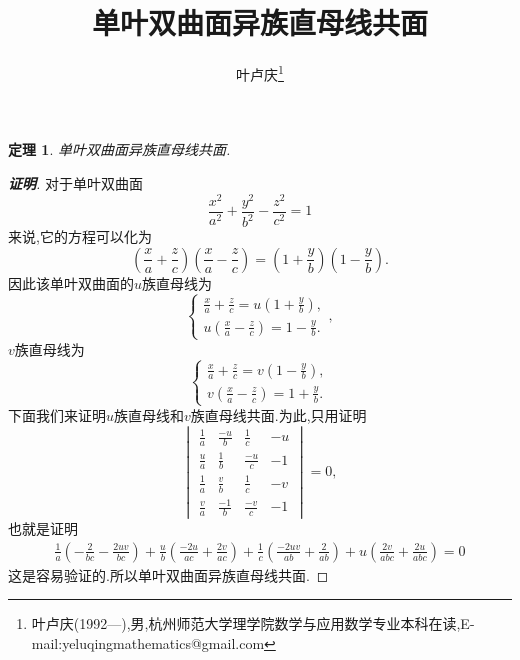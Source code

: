 \documentclass[a4paper]{article}
\newtheorem*{theo}{定理}
\newenvironment{theorem}
{\bigskip\begin{mdframed}\begin{theo}}
    {\end{theo}\end{mdframed}\bigskip}
\begin{document}
\title{\huge{\bf{单叶双曲面异族直母线共面}}} \author{\small{叶卢庆\footnote{叶卢庆(1992---),男,杭州师范大学理学院数学与应用数学专业本科在读,E-mail:yeluqingmathematics@gmail.com}}}
\maketitle
\begin{theorem}
单叶双曲面异族直母线共面.
\end{theorem}
\begin{proof}[\textbf{证明}]
对于单叶双曲面
$$
\frac{x^2}{a^2}+\frac{y^2}{b^2}-\frac{z^2}{c^2}=1
$$
来说,它的方程可以化为
$$
\left(\frac{x}{a}+\frac{z}{c}\right)\left(\frac{x}{a}-\frac{z}{c}\right)=\left(1+\frac{y}{b}\right)\left(1-\frac{y}{b}\right).
$$
因此该单叶双曲面的$u$族直母线为
$$
\begin{cases}
  \frac{x}{a}+\frac{z}{c}=u(1+\frac{y}{b}),\\
u(\frac{x}{a}-\frac{z}{c})=1-\frac{y}{b}.
\end{cases},
$$
$v$族直母线为
$$
\begin{cases}
  \frac{x}{a}+\frac{z}{c}=v(1-\frac{y}{b}),\\
v(\frac{x}{a}-\frac{z}{c})=1+\frac{y}{b}.
\end{cases}
$$
下面我们来证明$u$族直母线和$v$族直母线共面.为此,只用证明
$$
\begin{vmatrix}
  \frac{1}{a}&\frac{-u}{b}&\frac{1}{c}&-u\\
\frac{u}{a}&\frac{1}{b}&\frac{-u}{c}&-1\\
\frac{1}{a}&\frac{v}{b}&\frac{1}{c}&-v\\
\frac{v}{a}&\frac{-1}{b}&\frac{-v}{c}&-1
\end{vmatrix}=0,
$$
也就是证明
\begin{align*}
\frac{1}{a}\left(-\frac{2}{bc}-\frac{2uv}{bc}\right)+\frac{u}{b}\left(\frac{-2u}{ac}+\frac{2v}{ac}\right)+\frac{1}{c}\left(\frac{-2uv}{ab}+\frac{2}{ab}\right)+u\left(\frac{2v}{abc}+\frac{2u}{abc}\right)=0
\end{align*}
这是容易验证的.所以单叶双曲面异族直母线共面.
\end{proof}
\end{document}

